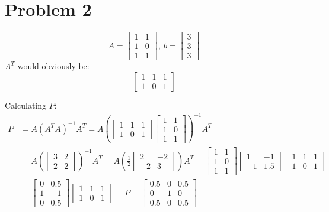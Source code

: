 \documentclass[11pt]{article}
\begin{document}
\section*{Problem 2}
$$A = \begin{bmatrix}1&1\\1&0\\1&1\end{bmatrix}, \ b = \begin{bmatrix}3\\3\\3\end{bmatrix}$$
$A^{T}$ would obviously be:
$$\begin{bmatrix}1&1&1\\1&0&1\end{bmatrix}$$

Calculating $P:$
\begin{equation*}
    \begin{split}
        P &= A(A^{T}A)^{-1}A^{T}= A(\begin{bmatrix}1&1&1\\1&0&1\end{bmatrix} \begin{bmatrix}1&1\\1&0\\1&1\end{bmatrix})^{-1}A^{T}\\
        &= A (\begin{bmatrix}3&2\\2&2\end{bmatrix})^{-1}A^{T} = A (\frac{1}{2}\begin{bmatrix}2&-2\\-2&3\end{bmatrix}) A^{T} = \begin{bmatrix}1&1\\1&0\\1&1\end{bmatrix}\begin{bmatrix}1&-1\\-1&1.5\end{bmatrix} \begin{bmatrix}1&1&1\\1&0&1\end{bmatrix}\\
        &= \begin{bmatrix}0&0.5\\1&-1\\0&0.5\end{bmatrix}\begin{bmatrix}1&1&1\\1&0&1\end{bmatrix} = P = \begin{bmatrix}0.5&0&0.5\\0&1&0\\0.5&0&0.5\end{bmatrix}
    \end{split}
\end{equation*}
\end{document}
